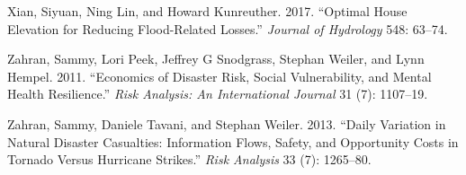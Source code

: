 \documentclass[
]{article}
\begin{document}
\leavevmode\hypertarget{ref-xian2017optimal}{}%
Xian, Siyuan, Ning Lin, and Howard Kunreuther. 2017. ``Optimal House
Elevation for Reducing Flood-Related Losses.'' \emph{Journal of
Hydrology} 548: 63--74.

\leavevmode\hypertarget{ref-zahran2011economics}{}%
Zahran, Sammy, Lori Peek, Jeffrey G Snodgrass, Stephan Weiler, and Lynn
Hempel. 2011. ``Economics of Disaster Risk, Social Vulnerability, and
Mental Health Resilience.'' \emph{Risk Analysis: An International
Journal} 31 (7): 1107--19.

\leavevmode\hypertarget{ref-zahran2013daily}{}%
Zahran, Sammy, Daniele Tavani, and Stephan Weiler. 2013. ``Daily
Variation in Natural Disaster Casualties: Information Flows, Safety, and
Opportunity Costs in Tornado Versus Hurricane Strikes.'' \emph{Risk
Analysis} 33 (7): 1265--80.
\end{document}
